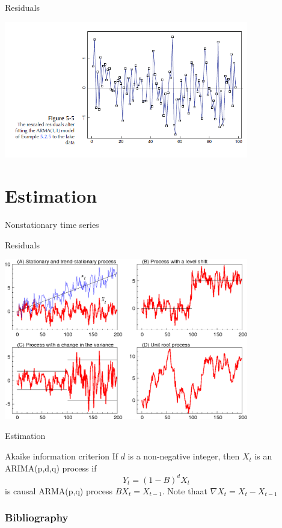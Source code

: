 \documentclass[11pt]{beamer}
\begin{document}
\begin{frame}{Residuals \cite{brockwell2002introduction}}
    \begin{center}
     \includegraphics[width=0.8\textwidth]{Pic/Residuals.png}
    \end{center}
\end{frame}

\section{Estimation}
\begin{frame}
\begin{center}
\Huge
Nonstationary time series
\end{center}
\end{frame}

\begin{frame}{Residuals \cite{brockwell2002introduction,ur}}
    \begin{center}
     \includegraphics[width=0.8\textwidth]{Pic/unit_root_ts.png}
    \end{center}
\end{frame}

\begin{frame}{Estimation \cite{brockwell2002introduction}}
\begin{alertblock}{Akaike information criterion}
If $d$ is a non-negative integer, then ${X_{t}}$ is an ARIMA(p,d,q) process if 
\begin{equation*}
Y_{t}=(1-B)^{d}X_{t}
\end{equation*}
is causal ARMA(p,q) process $BX_{t}=X_{t-1}$. Note thaat $\nabla X_{t}=X_{t}-X_{t-1}$
\end{alertblock}
\end{frame}


\begin{frame}
\frametitle{Bibliography}
\printbibliography
\end{frame}
\end{document}
